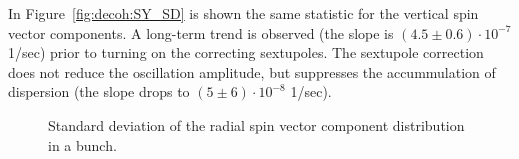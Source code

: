 In Figure~\ref{fig:decoh:SY_SD} is shown the same statistic for the vertical spin vector components.
A long-term trend is observed (the slope is $(4.5 \pm 0.6)\cdot 10^{-7}$ 1/sec) prior to turning on
the correcting sextupoles. The sextupole correction does not reduce the oscillation amplitude, 
but suppresses the accummulation of dispersion (the slope drops to $(5\pm 6)\cdot 10^{-8}$ 1/sec).

\begin{figure}[h!]
	\centering
	\caption{Standard deviation of the radial spin vector component distribution in a bunch.\label{fig:decoh:SX_SD}}
\end{figure}

